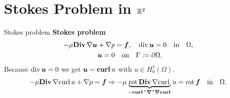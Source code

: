 \documentclass[10pt, compress]{beamer}
\begin{document}
\section{Stokes Problem in $\mathbb{R}^2$}
\begin{frame}{Stokes problem}
\textbf{Stokes problem}
    \begin{align*}
        -\mu {\rm\bf Div\,} \nabla \boldsymbol{u} +\nabla p &= \boldsymbol{f}, \quad {\rm div\,} \boldsymbol{u} = 0 \quad  \text{in} \quad \Omega, \\
        \hspace{5em}\boldsymbol{u} = 0 & \quad \text{on} \quad \Gamma:=\partial \Omega. 
    \end{align*}
Because ${\rm div\,} \boldsymbol{u} = 0 $ we get $\boldsymbol{u} = {\bf curl\,} u$ with $u \in H^1_0(\Omega)$.
\begin{align*}
        -\mu {\rm\bf Div\,} \nabla {\rm curl\,} u+ \nabla p = \boldsymbol{f}  \Rightarrow -\mu \underbrace{{\rm rot\,} {\rm\bf Div\,} \nabla {\rm curl\,}}_{- {\bf curl\,}^{*}\boldsymbol{\nabla}^{*}\boldsymbol{\nabla}{\bf curl\,}} u = {\rm rot\,} \boldsymbol{f} \quad \text{in} \quad \Omega.
\end{align*}
\end{frame}
\end{document}

